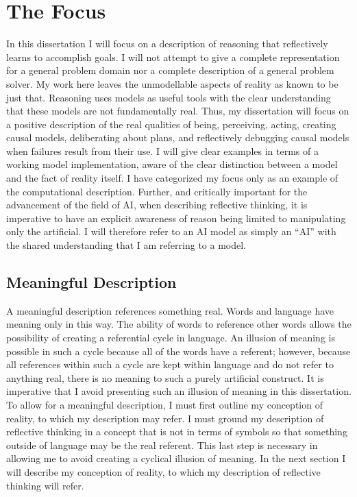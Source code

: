 \chapter{The Focus}
\label{ch:the_focus}

In this dissertation I will focus on a description of reasoning that
reflectively learns to accomplish goals.  I will not attempt to give a
complete representation for a general problem domain nor a complete
description of a general problem solver.  My work here leaves the
unmodellable aspects of reality as known to be just that.  Reasoning
uses models as useful tools with the clear understanding that these
models are not fundamentally real.  Thus, my dissertation will focus
on a positive description of the real qualities of being, perceiving,
acting, creating causal models, deliberating about plans, and
reflectively debugging causal models when failures result from their
use.  I will give clear examples in terms of a working model
implementation, aware of the clear distinction between a model and the
fact of reality itself.  I have categorized my focus only as an
example of the computational description.  Further, and critically
important for the advancement of the field of AI, when describing
reflective thinking, it is imperative to have an explicit awareness of
reason being limited to manipulating only the artificial.  I will
therefore refer to an AI model as simply an ``AI'' with the shared
understanding that I am referring to a model.

\section{Meaningful Description}

A meaningful description references something real.  Words and
language have meaning only in this way.  The ability of words to
reference other words allows the possibility of creating a referential
cycle in language.  An illusion of meaning is possible in such a cycle
because all of the words have a referent; however, because all
references within such a cycle are kept within language and do not
refer to anything real, there is no meaning to such a purely
artificial construct.  It is imperative that I avoid presenting such
an illusion of meaning in this dissertation.  To allow for a
meaningful description, I must first outline my conception of reality,
to which my description may refer.  I must ground my description of
reflective thinking in a concept that is not in terms of symbols so
that something outside of language may be the real referent.  This
last step is necessary in allowing me to avoid creating a cyclical
illusion of meaning.  In the next section I will describe my
conception of reality, to which my description of reflective thinking
will refer.


